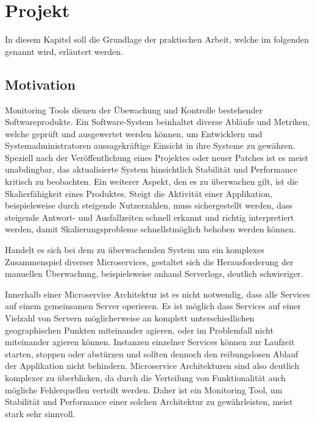 
\chapter{Projekt \projectname{}}

In diesem Kapitel soll die Grundlage der praktischen Arbeit, welche im folgenden \projectname{} genannt wird, erläutert werden.

\section{Motivation}
\label{sec:motivation}

Monitoring Tools dienen der Übewachung und Kontrolle bestehender Softwareprodukte.
Ein Software-System beinhaltet diverse Abläufe und Metriken, welche geprüft und ausgewertet werden können, um Entwicklern und Systemadministratoren
aussagekräftige Einsicht in ihre Systeme zu gewähren. Speziell nach der Veröffentlichung eines Projektes oder neuer Patches
ist es meist unabdingbar, das aktualisierte System hinsichtlich Stabilität und Performance kritisch zu beobachten. Ein weiterer Aspekt, den es zu überwachen gilt,
ist die Skalierfähigkeit eines Produktes. Steigt die Aktivität einer Applikation, beispielsweise durch steigende Nutzerzahlen,
muss sichergestellt werden, dass steigende Antwort- und Ausfallzeiten schnell erkannt und richtig interpretiert werden, damit Skalierungsprobleme schnellstmöglich behoben werden können.

Handelt es sich bei dem zu überwachenden System um ein komplexes Zusammenspiel diverser Microservices, gestaltet sich die Herausforderung der manuellen Überwachung, beispielsweise anhand
Serverlogs, deutlich schwieriger.

Innerhalb einer Microservice Architektur ist es nicht notwendig, dass alle Services auf einem gemeinsamen Server operieren.
Es ist möglich dass Services auf einer Vielzahl von Servern möglicherweise an komplett unterschiedlichen geographischen Punkten miteinander agieren,
oder im Problemfall nicht miteinander agieren können. Instanzen einzelner Services können zur Laufzeit starten, stoppen oder abstürzen
und sollten dennoch den reibungslosen Ablauf der Applikation nicht behindern. Microservice Architekturen sind also deutlich komplexer zu überblicken, da durch die Verteilung von Funktionalität auch
mögliche Fehlerquellen verteilt werden.
Daher ist ein Monitoring Tool, um Stabilität und Performance einer solchen Architektur zu gewährleisten, meist stark sehr sinnvoll.

